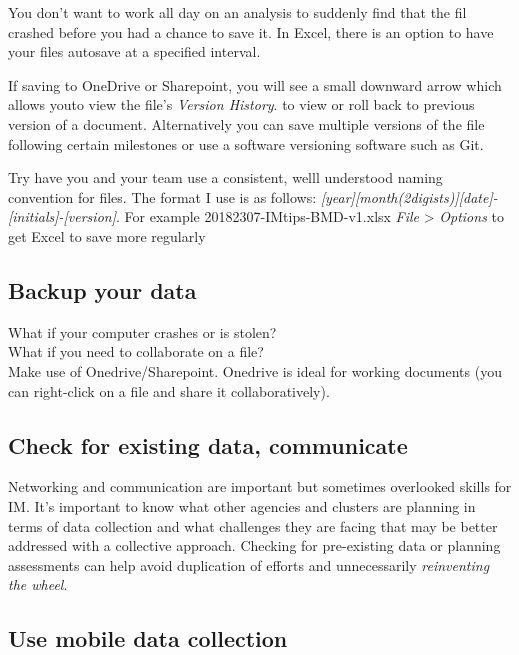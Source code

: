 \documentclass[
  a4paper,
  onecolumn,
  oneside]{book}
\begin{document}
You don't want to work all day on an analysis to suddenly find that the
fil crashed before you had a chance to save it. In Excel, there is an
option to have your files autosave at a specified interval.

If saving to OneDrive or Sharepoint, you will see a small downward arrow
which allows youto view the file's \emph{Version History}. to view or
roll back to previous version of a document. Alternatively you can save
multiple versions of the file following certain milestones or use a
software versioning software such as Git.

Try have you and your team use a consistent, welll understood naming
convention for files. The format I use is as follows:
\emph{{[}year{]}{[}month(2digists){]}{[}date{]}-{[}initials{]}-{[}version{]}}.
For example 20182307-IMtips-BMD-v1.xlsx \emph{File} \textgreater{}
\emph{Options} to get Excel to save more regularly

\hypertarget{backup-your-data}{%
\subsection{Backup your data}\label{backup-your-data}}

What if your computer crashes or is stolen?\\
What if you need to collaborate on a file?\\
Make use of Onedrive/Sharepoint. Onedrive is ideal for working documents
(you can right-click on a file and share it collaboratively).

\hypertarget{check-for-existing-data-communicate}{%
\subsection{Check for existing data,
communicate}\label{check-for-existing-data-communicate}}

Networking and communication are important but sometimes overlooked
skills for IM. It's important to know what other agencies and clusters
are planning in terms of data collection and what challenges they are
facing that may be better addressed with a collective approach. Checking
for pre-existing data or planning assessments can help avoid duplication
of efforts and unnecessarily \emph{reinventing the wheel}.

\hypertarget{use-mobile-data-collection}{%
\subsection{Use mobile data
collection}\label{use-mobile-data-collection}}
\end{document}
